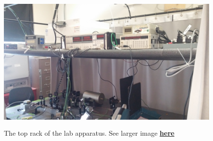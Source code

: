 \documentclass{../lab}
\begin{document}
\begin{figure}[H]
\begin{minipage}[t]{0.32\textwidth}
    \href{http://experimentationlab.berkeley.edu/sites/default/files/images/MNOtoprack.jpg}{\includegraphics[width=\linewidth,keepaspectratio]{images/MNOtoprack.jpg}}
    \caption{The top rack of the lab apparatus. See larger image \href{http://experimentationlab.berkeley.edu/sites/default/files/images/MNOtoprack.jpg}{\textbf{here}}}
\end{minipage}
\end{figure}
\end{document}
